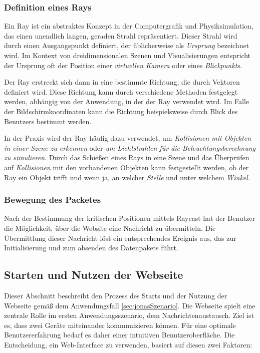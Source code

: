 \subsubsection*{Definition eines Rays} %
Ein Ray ist ein abstraktes Konzept in der Computergrafik und Physiksimulation, das einen unendlich langen, geraden
Strahl repräsentiert. Dieser Strahl wird durch einen Ausgangspunkt definiert, der üblicherweise als \textit{Ursprung}
bezeichnet wird. Im Kontext von dreidimensionalen Szenen und Visualisierungen entspricht der Ursprung oft der Position
einer \textit{virtuellen Kamera} oder eines \textit{Blickpunkts}.

Der Ray erstreckt sich dann in eine bestimmte Richtung, die durch Vektoren definiert wird. Diese Richtung kann durch
verschiedene Methoden festgelegt werden, abhängig von der Anwendung, in der der Ray verwendet wird. Im Falle der
Bildschirmkoordinaten kann die Richtung beispielsweise durch  Blick des Benutzers bestimmt werden.

In der Praxis wird der Ray häufig dazu verwendet, um \textit{Kollisionen mit Objekten in einer Szene zu erkennen} oder
\textit{um Lichtstrahlen für die Beleuchtungsberechnung zu simulieren}. Durch das Schießen eines Rays in eine Szene und
das Überprüfen auf \textit{Kollisionen} mit den vorhandenen Objekten kann festgestellt werden, ob der Ray ein Objekt
trifft und wenn ja, an welcher \textit{Stelle} und unter welchem \textit{Winkel}.\\

\subsubsection{Bewegung des Packetes}
Nach der Bestimmung der kritischen Positionen mittels Raycast hat der Benutzer die Möglichkeit, über die Website eine
Nachricht zu übermitteln. Die Übermittlung dieser Nachricht löst ein entsprechendes Ereignis aus, das zur
Initialisierung und zum absenden des Datenpakets führt.


\subsection{Starten und Nutzen der Webseite} 
Dieser Abschnitt beschreibt den Prozess des Starts und der Nutzung der Webseite gemäß dem Anwendungsfall \ref{sec:jonasSzenario}. Die Webseite spielt eine zentrale Rolle im ersten Anwendungsszenario, dem Nachrichtenaustausch. Ziel ist es, dass zwei Geräte miteinander kommunizieren können. Für eine optimale Benutzererfahrung bedarf es daher einer intuitiven Benutzeroberfläche. Die Entscheidung, ein Web-Interface zu verwenden, basiert auf diesen zwei Faktoren:

